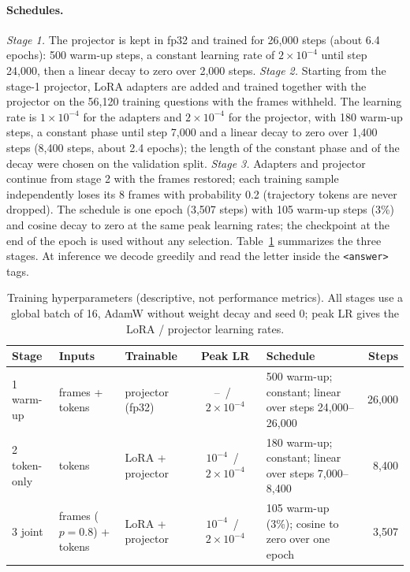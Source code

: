 \paragraph{Schedules.}
\emph{Stage 1.} The projector is kept in fp32 and trained for 26,000 steps (about 6.4 epochs): 500 warm-up steps, a constant learning rate of $2\times10^{-4}$ until step 24,000, then a linear decay to zero over 2,000 steps.
\emph{Stage 2.} Starting from the stage-1 projector, LoRA adapters are added and trained together with the projector on the 56,120 training questions with the frames withheld. The learning rate is $1\times10^{-4}$ for the adapters and $2\times10^{-4}$ for the projector, with 180 warm-up steps, a constant phase until step 7,000 and a linear decay to zero over 1,400 steps (8,400 steps, about 2.4 epochs); the length of the constant phase and of the decay were chosen on the validation split.
\emph{Stage 3.} Adapters and projector continue from stage 2 with the frames restored; each training sample independently loses its 8 frames with probability 0.2 (trajectory tokens are never dropped). The schedule is one epoch (3,507 steps) with 105 warm-up steps (3\%) and cosine decay to zero at the same peak learning rates; the checkpoint at the end of the epoch is used without any selection.
Table~\ref{tab:train} summarizes the three stages.
At inference we decode greedily and read the letter inside the \texttt{<answer>} tags.

\begin{table}[t]
\caption{Training hyperparameters (descriptive, not performance metrics). All stages use a global batch of 16, AdamW without weight decay and seed 0; peak LR gives the LoRA / projector learning rates.}
\label{tab:train}
\begin{center}
\footnotesize
\setlength{\tabcolsep}{3pt}
\begin{tabular}{lp{2.3cm}lcp{3.3cm}r}
\toprule
\textbf{Stage} & \textbf{Inputs} & \textbf{Trainable} & \textbf{Peak LR} & \textbf{Schedule} & \textbf{Steps} \\
\midrule
1 warm-up   & frames + tokens            & projector (fp32) & --~/~$2\!\times\!10^{-4}$        & 500 warm-up; constant; linear over steps 24,000--26,000 & 26,000 \\
2 token-only & tokens                    & LoRA + projector & $10^{-4}$~/~$2\!\times\!10^{-4}$ & 180 warm-up; constant; linear over steps 7,000--8,400   & 8,400 \\
3 joint     & frames ($p{=}0.8$) + tokens & LoRA + projector & $10^{-4}$~/~$2\!\times\!10^{-4}$ & 105 warm-up (3\%); cosine to zero over one epoch       & 3,507 \\
\bottomrule
\end{tabular}
\end{center}
\end{table}

